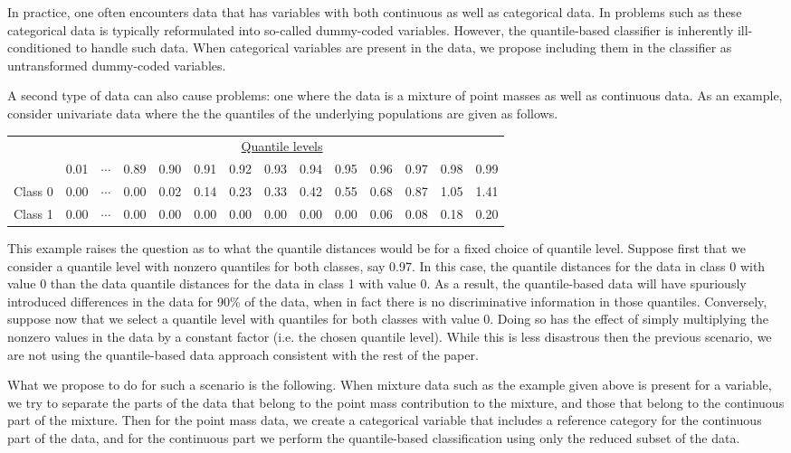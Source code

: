 \documentclass{article}
\begin{document}
In practice, one often encounters data that has variables with both continuous
as well as categorical data.  In problems such as these categorical data is
typically reformulated into so-called dummy-coded variables.  However, the
quantile-based classifier is inherently ill-conditioned to handle such data.
When categorical variables are present in the data, we propose including them in
the classifier as untransformed dummy-coded variables.

A second type of data can also cause problems:  one where the data is a mixture
of point masses as well as continuous data.  As an example, consider univariate
data where the the quantiles of the underlying populations are given as follows.
\begin{center}
  \begin{tabular}{lrrrrrrrrrrrrr}
    \toprule
    & \multicolumn{13}{c}{\underline{Quantile levels}} \\
    & 0.01 & $\cdots$ & 0.89 & 0.90 & 0.91 & 0.92 & 0.93 & 0.94 & 0.95 & 0.96 & 0.97 & 0.98 & 0.99 \\
    \midrule
    Class 0 \hspace{5mm} & 0.00 & $\cdots$ & 0.00 & 0.02 & 0.14 & 0.23 & 0.33 & 0.42 & 0.55 & 0.68 & 0.87 & 1.05 & 1.41 \\
    Class 1 & 0.00 & $\cdots$ & 0.00 & 0.00 & 0.00 & 0.00 & 0.00 & 0.00 & 0.00 & 0.06 & 0.08 & 0.18 & 0.20 \\
    \bottomrule
  \end{tabular}
\end{center}
This example raises the question as to what the quantile distances would be for
a fixed choice of quantile level.  Suppose first that we consider a quantile
level with nonzero quantiles for both classes, say 0.97.  In this case, the
quantile distances for the data in class 0 with value 0 than the data quantile
distances for the data in class 1 with value 0.  As a result, the quantile-based
data will have spuriously introduced differences in the data for 90\% of the
data, when in fact there is no discriminative information in those quantiles.
Conversely, suppose now that we select a quantile level with quantiles for both
classes with value 0.  Doing so has the effect of simply multiplying the nonzero
values in the data by a constant factor (i.e. the chosen quantile level).  While
this is less disastrous then the previous scenario, we are not using the
quantile-based data approach consistent with the rest of the paper.

What we propose to do for such a scenario is the following.  When mixture data
such as the example given above is present for a variable, we try to separate
the parts of the data that belong to the point mass contribution to the mixture,
and those that belong to the continuous part of the mixture.  Then for the point
mass data, we create a categorical variable that includes a reference category
for the continuous part of the data, and for the continuous part we perform the
quantile-based classification using only the reduced subset of the data.




\newpage

\end{document}
